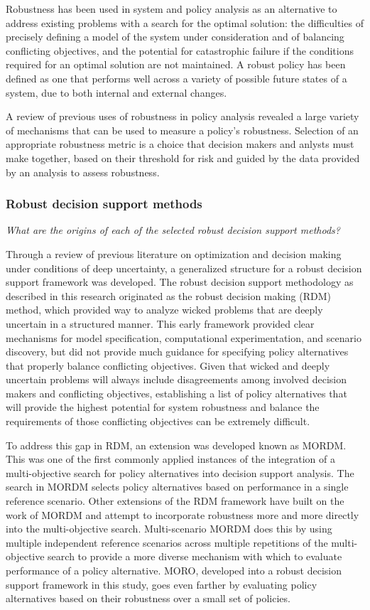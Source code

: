         Robustness has been used in system and policy analysis as an alternative to address existing problems with a search for the optimal solution: the difficulties of precisely defining a model of the system under consideration and of balancing conflicting objectives, and the potential for catastrophic failure if the conditions required for an optimal solution are not maintained. A robust policy has been defined as one that performs well across a variety of possible future states of a system, due to both internal and external changes.
        
        A review of previous uses of robustness in policy analysis revealed a large variety of mechanisms that can be used to measure a policy's robustness. Selection of an appropriate robustness metric is a choice that decision makers and anlysts must make together, based on their threshold for risk and guided by the data provided by an analysis to assess robustness. 
        
        \subsubsection{Robust decision support methods}
        \textit{What are the origins of each of the selected robust decision support methods?}
        
        Through a review of previous literature on optimization and decision making under conditions of deep uncertainty, a generalized structure for a robust decision support framework was developed. The robust decision support methodology as described in this research originated as the robust decision making (RDM) method, which provided way to analyze wicked problems that are deeply uncertain in a structured manner. This early framework provided clear mechanisms for model specification, computational experimentation, and scenario discovery, but did not provide much guidance for specifying policy alternatives that properly balance conflicting objectives. Given that wicked and deeply uncertain problems will always include disagreements among involved decision makers and conflicting objectives, establishing a list of policy alternatives that will provide the highest potential for system robustness and balance the requirements of those conflicting objectives can be extremely difficult. 
        
        To address this gap in RDM, an extension was developed known as MORDM. This was one of the first commonly applied instances of the integration of a multi-objective search for policy alternatives into decision support analysis. The search in MORDM selects policy alternatives based on performance in a single reference scenario. Other extensions of the RDM framework have built on the work of MORDM and attempt to incorporate robustness more and more directly into the multi-objective search. Multi-scenario MORDM does this by using multiple independent reference scenarios across multiple repetitions of the multi-objective search to provide a more diverse mechanism with which to evaluate performance of a policy alternative. MORO, developed into a robust decision support framework in this study, goes even farther by evaluating policy alternatives based on their robustness over a small set of policies. 
        
